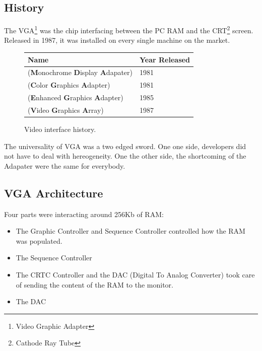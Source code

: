 \documentclass[book.tex]{subfiles}
\begin{document}
  \subsection{History}

The VGA\footnote{Video Graphic Adapter} was the chip interfacing between the PC RAM and the CRT\footnote{Cathode Ray Tube} screen. Released in 1987, it was installed on every single machine on the market. 

\bigskip
  
 \begin{figure}[H]
\centering  
\begin{tabularx}{0.9\textwidth}{ X  Y }
  \toprule
  \textbf{Name} &  \textbf{Year Released} \\
  \toprule {}
   (\textbf{M}onochrome
   \textbf{D}isplay
   \textbf{A}dapater) & 1981 
   \\ 
   (\textbf{C}olor
   \textbf{G}raphics
   \textbf{A}dapter) & 1981 
    \\ 
   (\textbf{E}nhanced
   \textbf{G}raphics
   \textbf{A}dapter) & 1985
   \\ 
   (\textbf{V}ideo
   \textbf{G}raphics
   \textbf{A}rray)  & 1987
    \\
  \toprule
\end{tabularx}
\caption{Video interface history.}\label{fig:vga_history}
\end{figure}

The universality of VGA was a two edged sword. One one side, developers did not have to deal with hereogeneity. One the other side, the shortcoming of the Adapater were the same for everybody.




\subsection{VGA Architecture}

  Four parts were interacting around 256Kb of RAM:

\begin{itemize}
\item The Graphic Controller and Sequence Controller controlled how the RAM was populated.
\item The Sequence Controller
\item The CRTC Controller and the DAC (Digital To Analog Converter) took care of sending the content of the RAM to the monitor.
\item The DAC
\end{itemize}
\end{document}
